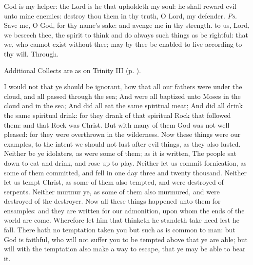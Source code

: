 \introit
{} God is my helper: the Lord is he that upholdeth my soul: he shall reward evil unto mine enemies: destroy thou them in thy truth, O Lord, my defender. \textit{Ps.} Save me, O God, for thy name's sake: and avenge me in thy strength.
\collect
{} to us, Lord, we beseech thee, the spirit to think and do always such things as be rightful: that we, who cannot exist without thee; may by thee be enabled to live according to thy will. Through.
\begin{rubric}
    Additional Collects are as on Trinity III (p. \pageref{TrinityIII}).
\end{rubric}
 I would not that ye should be ignorant, how that all our fathers were under the cloud, and all passed through the sea; And were all baptized unto Moses in the cloud and in the sea; And did all eat the same spiritual meat; And did all drink the same spiritual drink: for they drank of that spiritual Rock that followed them: and that Rock was Christ. But with many of them God was not well pleased: for they were overthrown in the wilderness. Now these things were our examples, to the intent we should not lust after evil things, as they also lusted. Neither be ye idolaters, as were some of them; as it is written, The people sat down to eat and drink, and rose up to play. Neither let us commit fornication, as some of them committed, and fell in one day three and twenty thousand. Neither let us tempt Christ, as some of them also tempted, and were destroyed of serpents. Neither murmur ye, as some of them also murmured, and were destroyed of the destroyer. Now all these things happened unto them for ensamples: and they are written for our admonition, upon whom the ends of the world are come. Wherefore let him that thinketh he standeth take heed lest he fall. There hath no temptation taken you but such as is common to man: but God is faithful, who will not suffer you to be tempted above that ye are able; but will with the temptation also make a way to escape, that ye may be able to bear it.


